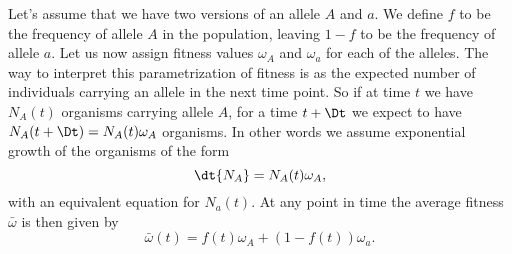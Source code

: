 Let's assume that we have two versions of an allele $A$ and $a$. We define $f$
to be the frequency of allele $A$ in the population, leaving $1 - f$ to be the
frequency of allele $a$. Let us now assign fitness values $\omega_A$ and
$\omega_a$ for each of the alleles. The way to interpret this parametrization
of fitness is as the expected number of individuals carrying an allele in the
next time point. So if at time $t$ we have $N_A(t)$ organisms carrying allele
$A$, for a time $t + \Dt$ we expect to have $N_A(t + \Dt) = N_A(t) \omega_A$
organisms. In other words we assume exponential growth of the organisms of the
form
\begin{equation}
  \dt{N_A} = N_A(t) \omega_A,
\end{equation}
with an equivalent equation for $N_a(t)$. At any point in time the average
fitness $\bar{\omega}$ is then given by
\begin{equation}
  \bar{\omega}(t) = f(t) \omega_A + (1 - f(t)) \omega_a.
\end{equation}

